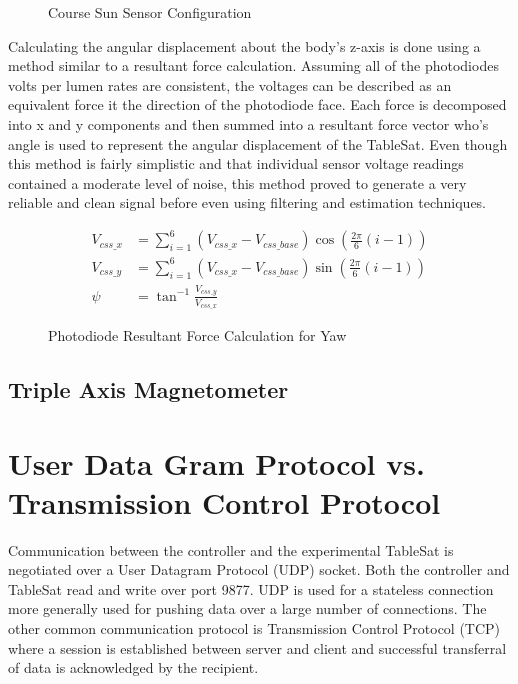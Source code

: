 \begin{figure}[H]
\centerline{}
\caption{Course Sun Sensor Configuration}
\label{fig:CSS}
\end{figure}

Calculating the angular displacement about the body's z-axis is done using a method similar to a resultant force calculation.  Assuming all of the photodiodes volts per lumen rates are consistent, the voltages can be described as an equivalent force it the direction of the photodiode face.  Each force is decomposed into x and y components and then summed into a resultant force vector who's angle is used to represent the angular displacement of the TableSat.  Even though this method is fairly simplistic and that individual sensor voltage readings contained a moderate level of noise, this method proved to generate a very reliable and clean signal before even using filtering and estimation techniques.

\begin{subequations}
\begin{align}
V_{css\_x} & = \sum\limits_{i=1}^6 (V_{css\_x} - V_{css\_base}) \cos \left( \frac{2\pi}{6} (i-1)\right) \\
V_{css\_y} & = \sum\limits_{i=1}^6 (V_{css\_x} - V_{css\_base}) \sin \left( \frac{2\pi}{6} (i-1)\right) \\
\psi & = \tan^{-1} \frac{V_{css\_y}}{V_{css\_x}}
\end{align}
\end{subequations}

\begin{figure}[H]
\centerline{}
\caption{Photodiode Resultant Force Calculation for Yaw}
\label{fig:CSSVectors}
\end{figure}


\subsection{Triple Axis Magnetometer}
\label{subsec:TripleAxisMagnetometer}


\section{User Data Gram Protocol vs. Transmission Control Protocol}
\label{subsec:UDPTCP}

Communication between the controller and the experimental TableSat is
negotiated over a User Datagram Protocol (UDP) socket.  Both the
controller and TableSat read and write over port 9877.  UDP is used for
a stateless connection more generally used for pushing data over a
large number of connections.  The other common communication protocol
is Transmission Control Protocol (TCP) where a session is established
between server and client and successful transferral of data is
acknowledged by the recipient.

